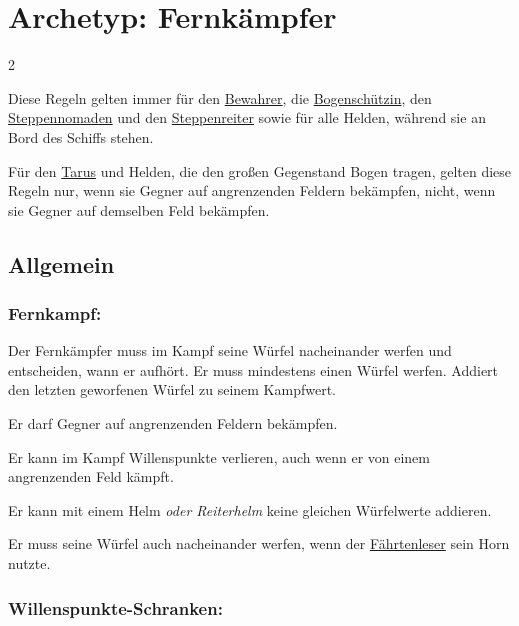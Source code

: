 \documentclass[10pt, a4paper, oneside]{book}
\newcommand{\fan}[1]{\textit{#1}}
\begin{document}
\chapter{Archetyp: Fernkämpfer}
\label{fernkaempfer}





\begin{multicols*}{2}\raggedcolumns


\begin{nobgcolor}
Diese Regeln gelten immer für den \hyperref[bewahrer]{Bewahrer}, die \hyperref[bogenschuetzin]{Bogenschützin}, den \hyperref[steppennomade]{Steppennomaden} und den \hyperref[steppenreiter]{Steppenreiter} sowie für alle Helden, während sie an Bord des Schiffs stehen.

Für den \hyperref[tarus]{Tarus} und Helden, die den großen Gegenstand Bogen tragen, gelten diese Regeln nur, wenn sie Gegner auf angrenzenden Feldern bekämpfen, nicht, wenn sie Gegner auf demselben Feld bekämpfen.


\section{Allgemein}



\subsection{Fernkampf:}

Der Fernkämpfer muss im Kampf seine Würfel nacheinander werfen und entscheiden, wann er aufhört. Er muss mindestens einen Würfel werfen. Addiert den letzten geworfenen Würfel zu seinem Kampfwert.

Er darf Gegner auf angrenzenden Feldern bekämpfen.

Er kann im Kampf Willenspunkte verlieren, auch wenn er von einem angrenzenden Feld kämpft.

Er kann mit einem Helm \fan{oder Reiterhelm} keine gleichen Würfelwerte addieren.
\supercite{dlva-begleitheft}

Er muss seine Würfel auch nacheinander werfen, wenn der \hyperref[faehrtenleser]{Fährtenleser} sein Horn nutzte.
\supercite{nh-begleitheft}



\subsection{Willenspunkte-Schranken:}


\end{nobgcolor}
\end{multicols*}
\end{document}

